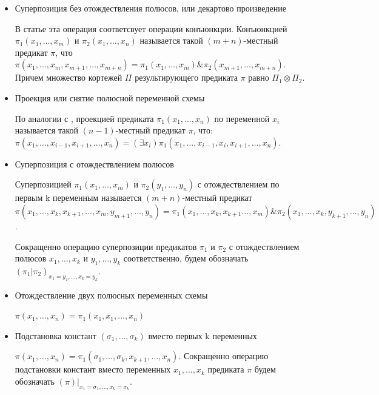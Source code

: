 \documentclass[12pt]{article}
\begin{document}
\begin{itemize}
    \item Суперпозиция без отождествления полюсов, или декартово произведение

    В статье \cite{Marchenkov} эта операция соответсвует операции конъюнкции.
    Конъюнкцией $\pi_1(x_1, \dots, x_m)$ и $\pi_2(x_1, \dots, x_n)$ называется такой $(m+n)$-местный предикат $\pi$, что
    $\pi(x_1, \dots, x_m, x_{m+1}, \dots, x_{m+n}) = \pi_1(x_1, \dots, x_m) \& \pi_2(x_{m+1}, \dots, x_{m+n})$.
    Причем множество кортежей $\Pi$ результирующего предиката $\pi$ равно $\Pi_1 \otimes \Pi_2$.

    \item Проекция или снятие полюсной переменной схемы

    По аналогии с \cite{Marchenkov}, проекцией предиката $\pi_1(x_1, \dots, x_n)$ по переменной $x_i$ называется такой
    $(n-1)$-местный предикат $\pi$, что:
    $\pi(x_1, \dots, x_{i-1}, x_{i+1}, \dots, x_n) = (\exists x_i) \pi_1(x_1, \dots, x_{i-1}, x_i, x_{i+1}, \dots, x_n)$.

    \item Суперпозиция с отождествлением полюсов

    Суперпозицией $\pi_1(x_1, \dots, x_m)$ и $\pi_2(y_1, \dots, y_n)$ с отождествлением по первым k переменным 
    называется $(m+n)$-местный предикат
    $\pi(x_1, \dots, x_k, x_{k+1}, \dots, x_m, y_{m+1}, \dots, y_n) = \pi_1(x_1, \dots, x_k, x_{k+1} \dots, x_m) \& \pi_2(x_1, \dots, x_k, y_{k+1}, \dots, y_n)$.

    Сокращенно операцию суперпозиции предикатов $\pi_1$ и $\pi_2$ с отождествлением полюсов 
    $x_1, \dots, x_k$ и $y_1, \dots, y_k$ соответственно, будем обозначать $(\pi_1|\pi_2)_{x_1=y_1, \dots, x_k=y_k}$.

    \item Отождествление двух полюсных переменных схемы

    $\pi(x_1, \dots, x_n) = \pi_1(x_1, x_1, \dots, x_n)$

    \item Подстановка констант $(\sigma_1, \dots, \sigma_k)$ вместо первых k переменных

    $\pi(x_1, \dots, x_n) = \pi_1(\sigma_1, \dots, \sigma_k, x_{k+1}, \dots, x_n)$. 
    Сокращенно операцию подстановки констант вместо переменных $x_1, \dots, x_k$ предиката $\pi$
    будем обозначать $(\pi)|_{x_1=\sigma_1, \dots, x_k=\sigma_k}$.

\end{itemize}
\end{document}
